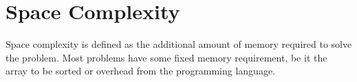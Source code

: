 \section{Space Complexity}

Space complexity is defined as the additional amount 
of memory required to solve the problem. Most problems 
have some fixed memory requirement, be it the array 
to be sorted or overhead from the programming language. 

